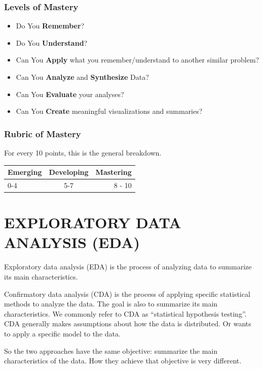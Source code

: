 \documentclass[
]{article}
\providecommand{\tightlist}{%
  \setlength{\itemsep}{0pt}\setlength{\parskip}{0pt}}
\begin{document}
\hypertarget{levels-of-mastery}{%
\subsubsection{Levels of Mastery}\label{levels-of-mastery}}

\begin{itemize}
\tightlist
\item
  Do You \textbf{Remember}?
\item
  Do You \textbf{Understand}?
\item
  Can You \textbf{Apply} what you remember/understand to another similar
  problem?
\item
  Can You \textbf{Analyze} and \textbf{Synthesize} Data?
\item
  Can You \textbf{Evaluate} your analyses?
\item
  Can You \textbf{Create} meaningful visualizations and summaries?
\end{itemize}

\hypertarget{rubric-of-mastery}{%
\subsubsection{Rubric of Mastery}\label{rubric-of-mastery}}

For every 10 points, this is the general breakdown.

\begin{longtable}[]{@{}lcr@{}}
\toprule
Emerging & Developing & Mastering\tabularnewline
\midrule
\endhead
0-4 & 5-7 & 8 - 10\tabularnewline
\bottomrule
\end{longtable}

\hypertarget{exploratory-data-analysis-eda}{%
\section{EXPLORATORY DATA ANALYSIS
(EDA)}\label{exploratory-data-analysis-eda}}

Exploratory data analysis (EDA) is the process of analyzing data to
summarize its main characteristics.

Confirmatory data analysis (CDA) is the process of applying specific
statistical methods to analyze the data. The goal is also to summarize
its main characteristics. We commonly refer to CDA as ``statistical
hypothesis testing''. CDA generally makes assumptions about how the data
is distributed. Or wants to apply a specific model to the data.

So the two approaches have the same objective: summarize the main
characteristics of the data. How they achieve that objective is very
different.
\end{document}
